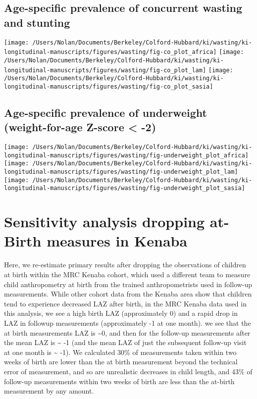 \documentclass[9pt,]{book}
\begin{document}
\section{Age-specific prevalence of concurrent wasting and
stunting}\label{age-specific-prevalence-of-concurrent-wasting-and-stunting-1}

\texttt{[image: /Users/Nolan/Documents/Berkeley/Colford-Hubbard/ki/wasting/ki-longitudinal-manuscripts/figures/wasting/fig-co\_plot\_africa]}
\texttt{[image: /Users/Nolan/Documents/Berkeley/Colford-Hubbard/ki/wasting/ki-longitudinal-manuscripts/figures/wasting/fig-co\_plot\_lam]}
\texttt{[image: /Users/Nolan/Documents/Berkeley/Colford-Hubbard/ki/wasting/ki-longitudinal-manuscripts/figures/wasting/fig-co\_plot\_sasia]}

\section{Age-specific prevalence of underweight (weight-for-age Z-score
\textless{}
-2)}\label{age-specific-prevalence-of-underweight-weight-for-age-z-score--2}

\texttt{[image: /Users/Nolan/Documents/Berkeley/Colford-Hubbard/ki/wasting/ki-longitudinal-manuscripts/figures/wasting/fig-underweight\_plot\_africa]}
\texttt{[image: /Users/Nolan/Documents/Berkeley/Colford-Hubbard/ki/wasting/ki-longitudinal-manuscripts/figures/wasting/fig-underweight\_plot\_lam]}
\texttt{[image: /Users/Nolan/Documents/Berkeley/Colford-Hubbard/ki/wasting/ki-longitudinal-manuscripts/figures/wasting/fig-underweight\_plot\_sasia]}

\chapter{Sensitivity analysis dropping at-Birth measures in
Kenaba}\label{no-kenaba}

\raggedright

Here, we re-estimate primary results after dropping the observations of
children at birth within the MRC Kenaba cohort, which used a different
team to measure child anthropometry at birth from the trained
anthropometrists used in follow-up measurements. While other cohort data
from the Kenaba area show that children tend to experience decreased LAZ
after birth, in the MRC Kenaba data used in this analysis, we see a high
birth LAZ (approximately 0) and a rapid drop in LAZ in followup
measurements (approximately -1 at one month). we see that the at birth
measurements LAZ is \textasciitilde{}0, and then for the follow-up
measurements after the mean LAZ is \textasciitilde{} -1 (and the mean
LAZ of just the subsequent follow-up visit at one month is
\textasciitilde{} -1). We calculated 30\% of measurements taken within
two weeks of birth are lower than the at birth measurement beyond the
technical error of measurement, and so are unrealistic decreases in
child length, and 43\% of follow-up measurements within two weeks of
birth are less than the at-birth measurement by any amount.
\end{document}
